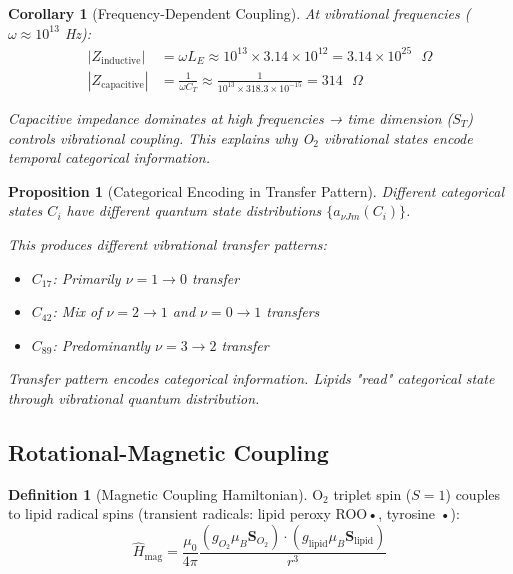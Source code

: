 \documentclass[11pt,a4paper]{article}
\newtheorem{proposition}[theorem]{Proposition}
\newtheorem{corollary}[theorem]{Corollary}
\theoremstyle{definition}
\newtheorem{definition}[theorem]{Definition}
\theoremstyle{remark}
\begin{document}
\begin{corollary}[Frequency-Dependent Coupling]
At vibrational frequencies ($\omega \approx 10^{13}$ Hz):
\begin{align}
|Z_{\text{inductive}}| &= \omega L_E \approx 10^{13} \times 3.14 \times 10^{12} = 3.14 \times 10^{25} \text{ }\Omega \\
|Z_{\text{capacitive}}| &= \frac{1}{\omega C_T} \approx \frac{1}{10^{13} \times 318.3 \times 10^{-15}} = 314 \text{ }\Omega
\end{align}

Capacitive impedance dominates at high frequencies → time dimension ($S_T$) controls vibrational coupling. This explains why O$_2$ vibrational states encode temporal categorical information.
\end{corollary}

\begin{proposition}[Categorical Encoding in Transfer Pattern]
Different categorical states $C_i$ have different quantum state distributions $\{a_{\nu Jm}(C_i)\}$.

This produces different vibrational transfer patterns:
\begin{itemize}
\item $C_{17}$: Primarily $\nu=1 \to 0$ transfer
\item $C_{42}$: Mix of $\nu=2 \to 1$ and $\nu=0 \to 1$ transfers
\item $C_{89}$: Predominantly $\nu=3 \to 2$ transfer
\end{itemize}

Transfer pattern encodes categorical information. Lipids "read" categorical state through vibrational quantum distribution.
\end{proposition}

\subsection{Rotational-Magnetic Coupling}

\begin{definition}[Magnetic Coupling Hamiltonian]
O$_2$ triplet spin ($S=1$) couples to lipid radical spins (transient radicals: lipid peroxy ROO•, tyrosine •):
\begin{equation}
\hat{H}_{\text{mag}} = \frac{\mu_0}{4\pi} \frac{(g_{O_2}\mu_B \mathbf{S}_{O_2}) \cdot (g_{\text{lipid}}\mu_B \mathbf{S}_{\text{lipid}})}{r^3}
\end{equation}
\end{definition}
\end{document}
